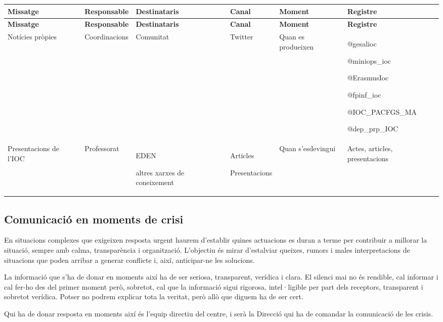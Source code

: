 \documentclass[fontsize=10pt,%
paper=a4,%
DIV=14,%
twoside=semi,%
pagesize=auto,%
parskip=half,
captions=tableheading,%
numbers=noenddot,%
toc=graduated%
]{scrartcl}
\renewcommand{\arraystretch}{1.75}%
\renewcommand{\arraystretch}{1.75}%
\begin{document}
\small{
\setlength{\tabcolsep}{10pt}
\renewcommand{\arraystretch}{1.5}
\begin{longtable}{p{3cm}p{2cm}p{2cm}p{1.5cm}p{2cm}p{1.5cm}}
\hline
\textbf{Missatge} & \textbf{Responsable} & \textbf{Destinataris} & \textbf{Canal} & \textbf{Moment}    & \textbf{Registre} \\
\hline \endfirsthead
\hline
\textbf{Missatge} & \textbf{Responsable} & \textbf{Destinataris} & \textbf{Canal} & \textbf{Moment}    & \textbf{Registre} \\
\hline \endhead
Notícies pròpies  & Coordinacions        & Comunitat             & Twitter        & Quan es produeixen & @gesalioc

@miniops\_ioc

@ErasmusIoc

@fpinf\_ioc

@IOC\_PACFGS\_MA

@dep\_prp\_IOC                                                                                                             \\
Presentacions de l'IOC                      & Professorat   & EDEN

altres xarxes de coneixement & Articles

Presentacions & Quan s'esdevingui   & Actes, articles, presentacions\\
\end{longtable}
}%


\subsection{Comunicació en moments de crisi}

En situacions complexes que exigeixen resposta urgent haurem d'establir quines actuacions es duran a terme per contribuir a millorar la situació, sempre amb calma, transparència i organització. L'objectiu és mirar d'estalviar queixes, rumors i males interpretacions de situacions que poden arribar a generar conflicte i, així, anticipar-ne les solucions.

La informació que s'ha de donar en moments així ha de ser seriosa, transparent, verídica i clara. El silenci mai no és rendible, cal informar i cal fer-ho des del primer moment però, sobretot, cal que la informació sigui rigorosa, intel·ligible per part dels receptors, transparent i sobretot verídica. Potser no podrem explicar tota la veritat, però allò que diguem ha de ser cert.

Qui ha de donar resposta en moments així és l'equip directiu del centre, i
serà la Direcció qui ha de comandar la comunicació de les crisis.
\end{document}
